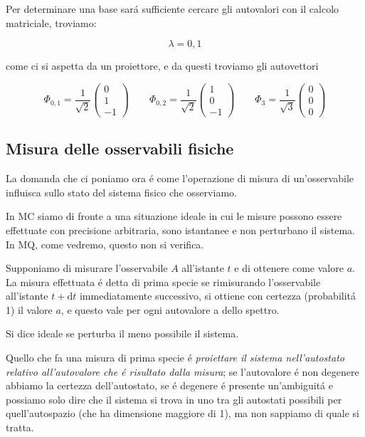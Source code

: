 \begin{itemize}
	Per determinare una base sar\'a sufficiente cercare gli autovalori con il calcolo matriciale, troviamo:
	
	$$\lambda = 0, 1$$ 
	
	come ci si aspetta da un proiettore, e da questi troviamo gli autovettori
	
	$$\Phi_{0,1}=\frac{1}{\sqrt{2}}\left(\begin{array}{c}{{0}}\\ {{1}}\\ {{-1}}\end{array}\right)\qquad\Phi_{0,2}=\frac{1}{\sqrt{2}}\left(\begin{array}{c}{{1}}\\ {{0}}\\ {{-1}}\end{array}\right)\qquad\Phi_{3}=\frac{1}{\sqrt{3}}\left(\begin{array}{c}{{0}}\\ {{0}}\\ {{0}}\end{array}\right)$$
\end{itemize}	

	
\subsection{Misura delle osservabili fisiche}

La domanda che ci poniamo ora \'e come l'operazione di misura di un'osservabile influisca sullo stato del sistema fisico che osserviamo.

In MC siamo di fronte a una situazione ideale in cui le misure possono essere effettuate con precisione arbitraria, sono istantanee e non perturbano il sistema. In MQ, come vedremo, questo non si verifica.

\begin{definizione}	
	Supponiamo di misurare l'osservabile $A$ all'istante $t$ e di ottenere come valore $a$. La misura effettuata \'e detta di prima specie se rimisurando l'osservabile all'istante $t + \mathrm{d}t$ immediatamente successivo, si ottiene con certezza (probabilit\'a 1) il valore $a$, e questo vale per ogni autovalore a dello spettro.

	Si dice ideale se perturba il meno possibile il sistema.
\end{definizione}

Quello che fa una misura di prima specie \'e \textit{proiettare il sistema nell'autostato relativo all'autovalore che \'e risultato dalla misura}; se l'autovalore \'e non degenere abbiamo la certezza dell'autostato, se \'e degenere \'e presente un'ambiguit\'a e possiamo solo dire che il sistema si trova in uno tra gli autostati possibili per quell'autospazio (che ha dimensione maggiore di 1), ma non sappiamo di quale si tratta.


